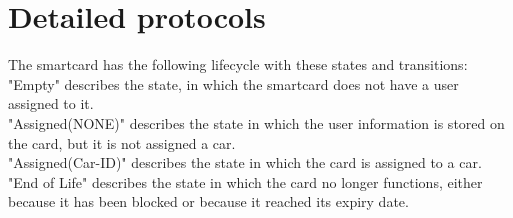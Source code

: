 \documentclass[a4paper]{article}
\begin{document}
\section{Detailed protocols}
The smartcard has the following lifecycle with these states and transitions:\\

"Empty" describes the state, in which the smartcard does not have a user assigned to it.\\
"Assigned(NONE)" describes the state in which the user information is stored on the card, but it is not assigned a car.\\
"Assigned(Car-ID)" describes the state in which the card is assigned to a car.\\
"End of Life" describes the state in which the card no longer functions, either because it has been blocked or because it reached its expiry date.
\end{document}

